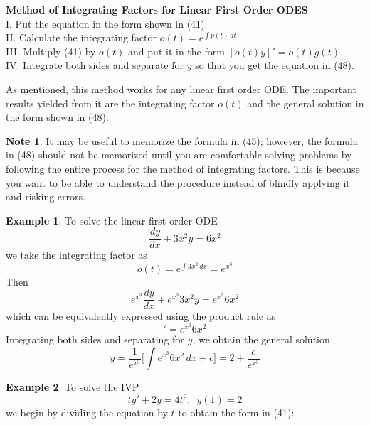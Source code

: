 \documentclass[11pt]{article}
\theoremstyle{definition}
\newtheorem{ex}{Example}
\newtheorem*{note*}{Note}
\begin{document}
\begin{shaded}
\textbf{Method of Integrating Factors for Linear First Order ODES}\\
I. Put the equation in the form shown in (41).\\
II. Calculate the integrating factor $o(t) = e^{\int p(t)\,dt}$.\\
III. Multiply (41) by $o(t)$ and put it in the form $[o(t)y]' = o(t)g(t)$.\\
IV. Integrate both sides and separate for $y$ so that you get the equation in (48).\end{shaded}As mentioned, this method works for any linear first order ODE. The important results yielded from it are the integrating factor $o(t)$ and the general solution in the form shown in (48).\begin{note*}
    It may be useful to memorize the formula in (45); however, the formula in (48) should not be memorized until you are comfortable solving problems by following the entire process for the method of integrating factors. This is because you want to be able to understand the procedure instead of blindly applying it and risking errors.
\end{note*}\begin{ex}
    To solve the linear first order ODE \begin{equation}
        \frac{dy}{dx} + 3x^2y = 6x^2
    \end{equation} we take the integrating factor as\begin{equation}
        o(t) = e^{\int 3x^2\,dx} = e^{x^3}
    \end{equation}Then \begin{equation}
        e^{x^3}\frac{dy}{dx} + e^{x^3}3x^2y = e^{x^3}6x^2
    \end{equation}which can be equivalently expressed using the product rule as \begin{equation}
        [e^{x^3}y]' = e^{x^3}6x^2
    \end{equation}
    Integrating both sides and separating for $y$, we obtain the general solution \begin{equation}
    y = \frac{1}{e^{x^3}}\Bigg[\int e^{x^3}6x^2\,dx + c\Bigg] = 2 + \frac{c}{e^{x^3}}
\end{equation}
\end{ex}\begin{ex}
    To solve the IVP \begin{equation}
        ty' + 2y = 4t^2,\,\,\, y(1) = 2
    \end{equation}we begin by dividing the equation by $t$ to obtain the form in (41):\begin{equation}

\end{equation}
\end{ex}
\end{document}
